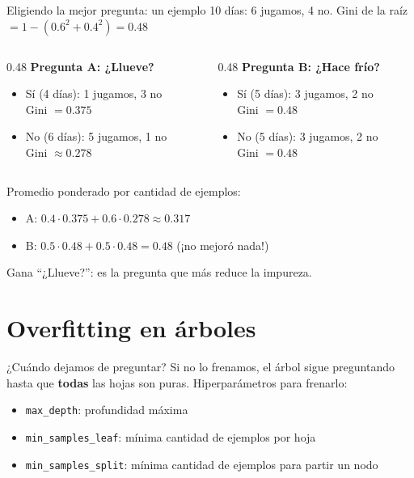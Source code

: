 \begin{frame}{Eligiendo la mejor pregunta: un ejemplo}
  10 días: 6 jugamos, 4 no. \quad Gini de la raíz $= 1 - (0.6^2 + 0.4^2) = 0.48$
  \vspace{0.5em}
  \begin{columns}[T]
    \begin{column}{0.48\textwidth}
      \textbf{Pregunta A: ¿Llueve?}
      \begin{itemize}
        \item Sí (4 días): 1 jugamos, 3 no \\ Gini $= 0.375$
        \item No (6 días): 5 jugamos, 1 no \\ Gini $\approx 0.278$
      \end{itemize}
    \end{column}
    \begin{column}{0.48\textwidth}
      \textbf{Pregunta B: ¿Hace frío?}
      \begin{itemize}
        \item Sí (5 días): 3 jugamos, 2 no \\ Gini $= 0.48$
        \item No (5 días): 3 jugamos, 2 no \\ Gini $= 0.48$
      \end{itemize}
    \end{column}
  \end{columns}
  \vspace{0.5em}
  \pause
  Promedio ponderado por cantidad de ejemplos:
  \begin{itemize}
    \item A: $0.4 \cdot 0.375 + 0.6 \cdot 0.278 \approx 0.317$
    \item B: $0.5 \cdot 0.48 + 0.5 \cdot 0.48 = 0.48$ \quad (¡no mejoró
      nada!)
  \end{itemize}
  Gana ``¿Llueve?'': es la pregunta que más reduce la impureza.
\end{frame}

\section{Overfitting en árboles}

\begin{frame}{¿Cuándo dejamos de preguntar?}
  Si no lo frenamos, el árbol sigue preguntando hasta que \textbf{todas}
  las hojas son puras.
  \pause
  Hiperparámetros para frenarlo:
  \begin{itemize}
    \item \texttt{max\_depth}: profundidad máxima
    \item \texttt{min\_samples\_leaf}: mínima cantidad de ejemplos por hoja
    \item \texttt{min\_samples\_split}: mínima cantidad de ejemplos para partir un nodo
  \end{itemize}
\end{frame}

